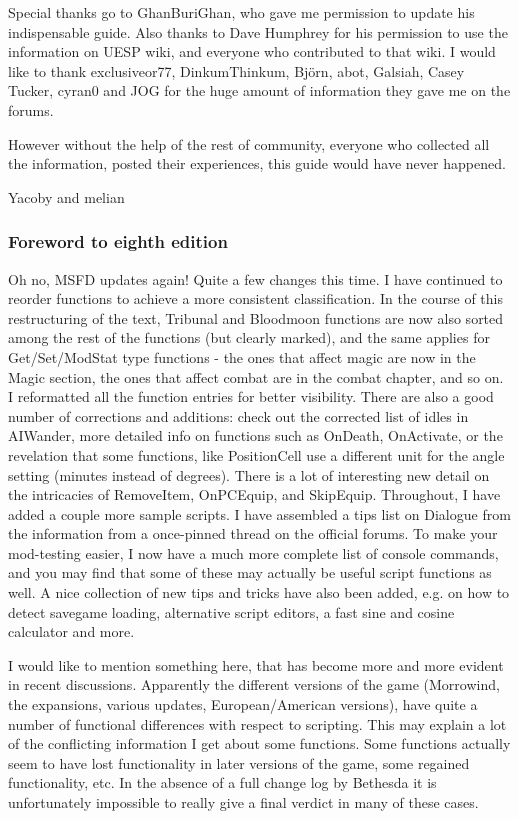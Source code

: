 \documentclass[
]{article}
\begin{document}
Special thanks go to GhanBuriGhan, who gave me permission to update his
indispensable guide. Also thanks to Dave Humphrey for his permission to
use the information on UESP wiki, and everyone who contributed to that
wiki. I would like to thank exclusiveor77, DinkumThinkum, Björn, abot,
Galsiah, Casey Tucker, cyran0 and JOG for the huge amount of information
they gave me on the forums.

However without the help of the rest of community, everyone who
collected all the information, posted their experiences, this guide
would have never happened.

Yacoby and melian

\hypertarget{foreword-to-eighth-edition}{%
\subsubsection{\texorpdfstring{\hfill\break
Foreword to eighth
edition}{ Foreword to eighth edition}}\label{foreword-to-eighth-edition}}

Oh no, MSFD updates again! Quite a few changes this time. I have
continued to reorder functions to achieve a more consistent
classification. In the course of this restructuring of the text,
Tribunal and Bloodmoon functions are now also sorted among the rest of
the functions (but clearly marked), and the same applies for
Get/Set/ModStat type functions - the ones that affect magic are now in
the Magic section, the ones that affect combat are in the combat
chapter, and so on. I reformatted all the function entries for better
visibility. There are also a good number of corrections and additions:
check out the corrected list of idles in AIWander, more detailed info on
functions such as OnDeath, OnActivate, or the revelation that some
functions, like PositionCell use a different unit for the angle setting
(minutes instead of degrees). There is a lot of interesting new detail
on the intricacies of RemoveItem, OnPCEquip, and SkipEquip. Throughout,
I have added a couple more sample scripts. I have assembled a tips list
on Dialogue from the information from a once-pinned thread on the
official forums. To make your mod-testing easier, I now have a much more
complete list of console commands, and you may find that some of these
may actually be useful script functions as well. A nice collection of
new tips and tricks have also been added, e.g. on how to detect savegame
loading, alternative script editors, a fast sine and cosine calculator
and more.

I would like to mention something here, that has become more and more
evident in recent discussions. Apparently the different versions of the
game (Morrowind, the expansions, various updates, European/American
versions), have quite a number of functional differences with respect to
scripting. This may explain a lot of the conflicting information I get
about some functions. Some functions actually seem to have lost
functionality in later versions of the game, some regained
functionality, etc. In the absence of a full change log by Bethesda it
is unfortunately impossible to really give a final verdict in many of
these cases.
\end{document}
